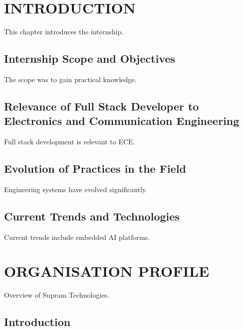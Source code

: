 \documentclass[12pt,a4paper]{report}
\begin{document}
\chapter{INTRODUCTION}
\label{ch:intro}


This chapter introduces the internship.


\section{Internship Scope and Objectives}

The scope was to gain practical knowledge.


\section{Relevance of Full Stack Developer to Electronics and Communication Engineering}

Full stack development is relevant to ECE.


\section{Evolution of Practices in the Field}

Engineering systems have evolved significantly.


\section{Current Trends and Technologies}

Current trends include embedded AI platforms.




\chapter{ORGANISATION PROFILE}
\label{ch:org}


Overview of Supram Technologies.


\section{Introduction}
\end{document}
